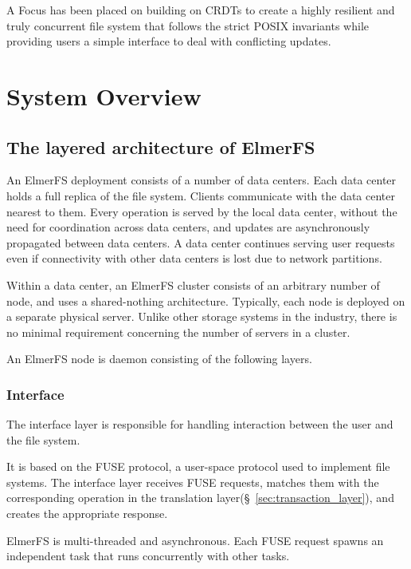 \documentclass[sigconf,anonymous,10pt]{acmart}
\begin{document}
A Focus has been placed on building on CRDTs to create a highly resilient and truly
concurrent file system that follows the strict POSIX invariants
while providing users a simple interface to deal with conflicting updates.

\section{System Overview}

\subsection{The layered architecture of ElmerFS}

An ElmerFS deployment consists of a number of data centers.
Each data center holds a full replica of the file system.
Clients communicate with the data center nearest to them.
Every operation is served by the local data center, without the need
for coordination across data centers,
and updates are asynchronously propagated between data centers.
A data center continues serving user requests even if connectivity
with other data centers is lost due to network partitions.

Within a data center, an ElmerFS cluster consists of an arbitrary number
of node, and uses a shared-nothing architecture.
Typically, each node is deployed on a separate physical server.
Unlike other storage systems in the industry, there is no minimal
requirement concerning the number of servers in a cluster.

An ElmerFS node is daemon consisting of the following layers.

\subsubsection{Interface}

The interface layer is responsible for handling interaction between the user
and the file system.

It is based on the FUSE protocol, a user-space protocol used to implement
file systems. The interface layer receives FUSE requests,
matches them with the corresponding operation in
the translation layer(\S~\ref{sec:transaction_layer}), and creates the appropriate response.

ElmerFS is multi-threaded and asynchronous. Each FUSE request spawns an
independent task that runs concurrently with other tasks.
\end{document}
